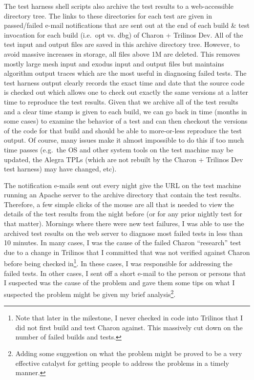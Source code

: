 \documentclass[pdf,ps2pdf,11pt]{SANDreport}
\begin{document}
The test harness shell scripts also archive the test results to a
web-accessible directory tree.  The links to these directories for each test
are given in passed/failed e-mail notifications that are sent out at the end
of each build \& test invocation for each build (i.e.\ opt vs. dbg) of Charon
+ Trilinos Dev.  All of the test input and output files are saved in this
archive directory tree.  However, to avoid massive increases in storage, all
files above 1M are deleted.  This removes mostly large mesh input and exodus
input and output files but maintains algorithm output traces which are the
most useful in diagnosing failed tests.  The test harness output clearly
records the exact time and date that the source code is checked out which
allows one to check out exactly the same versions at a latter time to
reproduce the test results.  Given that we archive all of the test results
and a clear time stamp is given to each build, we can go back in time (months
in some cases) to examine the behavior of a test and can then checkout the
versions of the code for that build and should be able to more-or-less
reproduce the test output.  Of course, many issues make it almost impossible
to do this if too much time passes (e.g.\ the OS and other system tools on the
test machine may be updated, the Alegra TPLs (which are not rebuilt by the
Charon + Trilinos Dev test harness) may have changed, etc).

The notification e-mails sent out every night give the URL on the test machine
running an Apache server to the archive directory that contain the test
results.  Therefore, a few simple clicks of the mouse are all that is needed
to view the details of the test results from the night before (or for any
prior nightly test for that matter).  Mornings where there were new test
failures, I was able to use the archived test results on the web server to
diagnose most failed tests in less than 10 minutes.  In many cases, I was the
cause of the failed Charon ``research'' test due to a change in Trilinos that
I committed that was not verified against Charon before being checked
in\footnote{Note that later in the milestone, I never checked in code into
Trilinos that I did not first build and test Charon against.  This massively
cut down on the number of failed builds and tests.}.  In these cases, I was
responsible for addressing the failed tests.  In other cases, I sent off a
short e-mail to the person or persons that I suspected was the cause of the
problem and gave them some tips on what I suspected the problem might be given
my brief analysis\footnote{Adding some suggestion on what the problem might be
proved to be a very effective catalyst for getting people to address the
problems in a timely manner.}.
\end{document}
